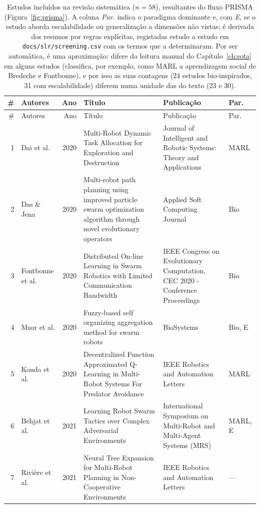 \begingroup\small
\begin{longtable}{@{}r>{\raggedright\arraybackslash}p{2.3cm}r>{\raggedright\arraybackslash}p{5.4cm}>{\raggedright\arraybackslash}p{3.0cm}p{1.4cm}@{}}
\caption[Estudos incluídos na revisão sistemática]{Estudos incluídos na revisão sistemática ($n = 58$), resultantes do fluxo PRISMA (Figura~\ref{fig:prisma}). A coluna \emph{Par.} indica o paradigma dominante e, com \emph{E}, se o estudo aborda escalabilidade ou generalização a dimensões não vistas; é derivada dos resumos por regras explícitas, registadas estudo a estudo em \texttt{docs/slr/screening.csv} com os termos que a determinaram. Por ser automática, é uma aproximação: difere da leitura manual do Capítulo~\ref{ch:sota} em alguns estudos (classifica, por exemplo, como MARL a aprendizagem social de Bredeche e Fontbonne), e por isso as suas contagens (24 estudos bio-inspirados, 31 com escalabilidade) diferem numa unidade das do texto (23 e 30).}\label{tab:slr_incluidos}\\
\hline
\# & Autores & Ano & Título & Publicação & Par. \\ \hline
\endfirsthead
\hline \# & Autores & Ano & Título & Publicação & Par. \\ \hline \endhead
1 & Dai et al. & 2020 & Multi-Robot Dynamic Task Allocation for Exploration and Destruction & Journal of Intelligent and Robotic Systems: Theory and Applications & MARL \\
2 & Das \& Jena & 2020 & Multi-robot path planning using improved particle swarm optimization algorithm through novel evolutionary operators & Applied Soft Computing Journal & Bio \\
3 & Fontbonne et al. & 2020 & Distributed On-line Learning in Swarm Robotics with Limited Communication Bandwidth & 2020 IEEE Congress on Evolutionary Computation, CEC 2020 - Conference Proceedings & Bio \\
4 & Mısır et al. & 2020 & Fuzzy-based self organizing aggregation method for swarm robots & BioSystems & Bio, E \\
5 & Konda et al. & 2020 & Decentralized Function Approximated Q-Learning in Multi-Robot Systems For Predator Avoidance & IEEE Robotics and Automation Letters & MARL \\
6 & Behjat et al. & 2021 & Learning Robot Swarm Tactics over Complex Adversarial Environments & 2021 International Symposium on Multi-Robot and Multi-Agent Systems (MRS) & MARL, E \\
7 & Rivière et al. & 2021 & Neural Tree Expansion for Multi-Robot Planning in Non-Cooperative Environments & IEEE Robotics and Automation Letters & --- \\

\end{longtable}
